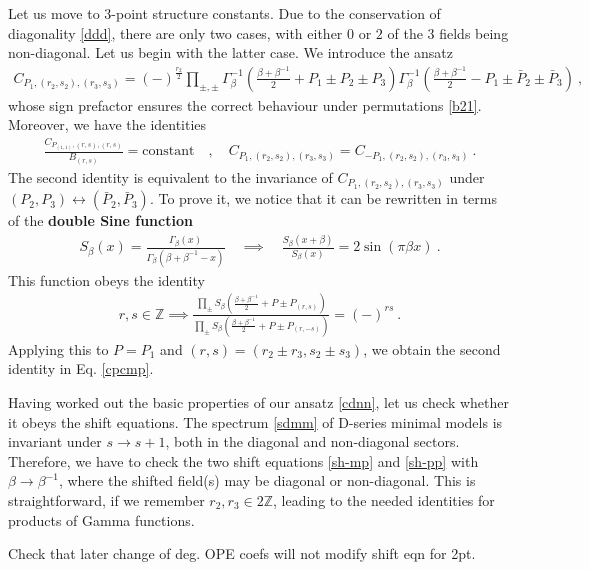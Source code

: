 \documentclass[12pt, a4paper]{article}
\theoremstyle{break}
\begin{document}
Let us move to 3-point structure constants. Due to the conservation of diagonality \eqref{ddd}, there are only two cases, with either $0$ or $2$ of the $3$ fields being non-diagonal. Let us begin with the latter case. We introduce the ansatz 
\begin{align}
 \boxed{C_{P_1,(r_2,s_2),(r_3,s_3)} = (-)^{\frac{r_2}{2}}\prod_{\pm,\pm}
 \Gamma_\beta^{-1}\left(\tfrac{\beta+\beta^{-1}}{2}+P_1 \pm P_2\pm P_3\right) 
 \Gamma_\beta^{-1}\left(\tfrac{\beta+\beta^{-1}}{2}-P_1 \pm \bar P_2\pm \bar P_3\right)}\ ,
 \label{cdnn}
\end{align}
whose sign prefactor ensures the correct behaviour under permutations \eqref{b21}. Moreover, we have the identities
\begin{align}
 \frac{C_{P_{(1,1)},(r,s),(r,s)}}{B_{(r,s)}} = \text{constant} \quad ,\quad 
 C_{P_1,(r_2,s_2),(r_3,s_3)}=C_{-P_1,(r_2,s_2),(r_3,s_3)} \ .
 \label{cpcmp}
\end{align}
The second identity is equivalent to the invariance of $C_{P_1,(r_2,s_2),(r_3,s_3)}$ under $(P_2,P_3)\leftrightarrow (\bar P_2,\bar P_3)$. To prove it, we notice that it can be rewritten in terms of the \textbf{double Sine function}
\begin{align}
 S_\beta(x) = \frac{\Gamma_\beta(x)}{\Gamma_\beta(\beta + \beta^{-1}-x)}\quad \implies \quad \frac{S_\beta(x+\beta)}{S_\beta(x)} = 2\sin(\pi\beta x)\ .
 \label{sb}
\end{align}
This function obeys the identity 
\begin{align}
 r,s\in\mathbb{Z} \implies \frac{\prod_\pm S_\beta\left(\frac{\beta+\beta^{-1}}{2} +P \pm P_{(r,s)}\right)}{\prod_\pm S_\beta\left(\frac{\beta+\beta^{-1}}{2} +P \pm P_{(r,-s)}\right)} =(-)^{rs}\ .
 \label{dsr}
\end{align}
Applying this to $P=P_1$ and $(r,s)=(r_2\pm r_3,s_2\pm s_3)$, we obtain the second identity in Eq. \eqref{cpcmp}.

Having worked out the basic properties of our ansatz \eqref{cdnn}, let us check whether it obeys the shift equations. The spectrum \eqref{sdmm} of D-series minimal models is invariant under $s\to s+1$, both in the diagonal and non-diagonal sectors. Therefore, we have to check the two shift equations \eqref{sh-mp} and \eqref{sh-pp} with $\beta\to\beta^{-1}$, where the shifted field(s) may be diagonal or non-diagonal. This is straightforward, if we remember $r_2,r_3\in 2\mathbb{Z}$, leading to the needed identities for products of Gamma functions. 

Check that later change of deg. OPE coefs will not modify shift eqn for 2pt. 
\end{document}

